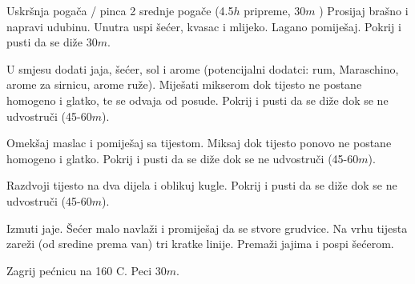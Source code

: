 \documentclass[a4paper]{article}
\begin{document}
\begin{recipe}{Uskršnja pogača / pinca}%
  {2 srednje pogače}%
  { (4.5$h$ pripreme, 30$m$ \oven )}
  Prosijaj brašno i napravi udubinu. Unutra uspi šećer, kvasac i mlijeko.
  Lagano pomiješaj. Pokrij i pusti da se diže 30$m$.

  U smjesu dodati jaja, šećer, sol i arome (potencijalni dodatci: rum, Maraschino, arome za sirnicu, arome ruže). Miješati mikserom dok tijesto ne postane homogeno i glatko, te se odvaja od posude. Pokrij i pusti da se diže dok se ne udvostruči (45-60$m$).

  Omekšaj maslac i pomiješaj sa tijestom. Miksaj dok tijesto ponovo ne postane
  homogeno i glatko. Pokrij i pusti da se diže dok se ne udvostruči (45-60$m$).

\newstep
  Razdvoji tijesto na dva dijela i oblikuj kugle. Pokrij i pusti da se diže dok
  se ne udvostruči (45-60$m$).

  Izmuti jaje. Šećer malo navlaži i promiješaj da se stvore grudvice. Na vrhu
  tijesta zareži (od sredine prema van) tri kratke linije. Premaži jajima i
  pospi šećerom.

\ingredient[]{}{\oven}
  Zagrij pećnicu na 160\0 C. Peci 30$m$.
\end{recipe}
\end{document}
